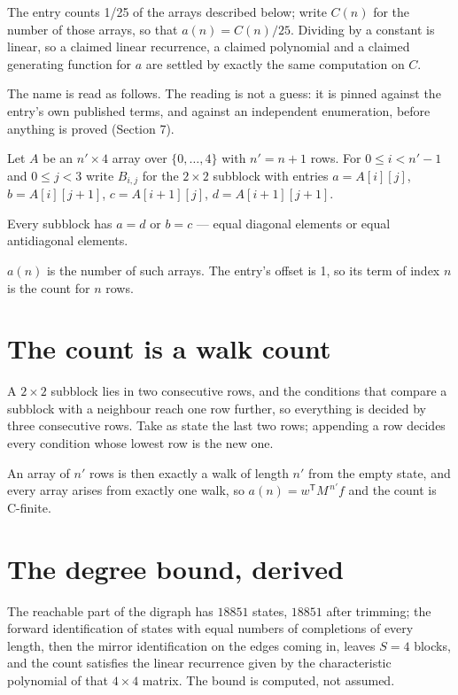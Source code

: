 \documentclass[11pt]{article}
\theoremstyle{definition}
\begin{document}
The entry counts 1/25 of the arrays described below; write $C(n)$ for the number of those arrays, so that $a(n) = C(n)/25$. Dividing by a constant is linear, so a claimed linear recurrence, a claimed polynomial and a claimed generating function for $a$ are settled by exactly the same computation on $C$.

The name is read as follows. The reading is not a guess: it is pinned against the entry's own published terms, and against an independent enumeration, before anything is proved (Section 7).

Let $A$ be an $n' \times 4$ array over $\{0,\dots,4\}$ with $n' = n + 1$ rows. For $0 \le i < n'-1$ and $0 \le j < 3$ write $B_{i,j}$ for the $2\times2$ subblock with entries $a = A[i][j]$, $b = A[i][j{+}1]$, $c = A[i{+}1][j]$, $d = A[i{+}1][j{+}1]$.

Every subblock has $a = d$ or $b = c$ --- equal diagonal elements or equal antidiagonal elements.

$a(n)$ is the number of such arrays. The entry's offset is 1, so its term of index $n$ is the count for $n$ rows.

\section{The count is a walk count}

A $2\times2$ subblock lies in two consecutive rows, and the conditions that compare a subblock with a neighbour reach one row further, so everything is decided by three consecutive rows. Take as state the last two rows; appending a row decides every condition whose lowest row is the new one.

An array of $n'$ rows is then exactly a walk of length $n'$ from the empty state, and every array arises from exactly one walk, so $a(n) = w^{\mathsf T}M^{\,n'}f$ and the count is C-finite.

\section{The degree bound, derived}

The reachable part of the digraph has $18851$ states, $18851$ after trimming; the forward identification of states with equal numbers of completions of every length, then the mirror identification on the edges coming in, leaves $S = 4$ blocks, and the count satisfies the linear recurrence given by the characteristic polynomial of that $4\times4$ matrix. The bound is computed, not assumed.
\end{document}
